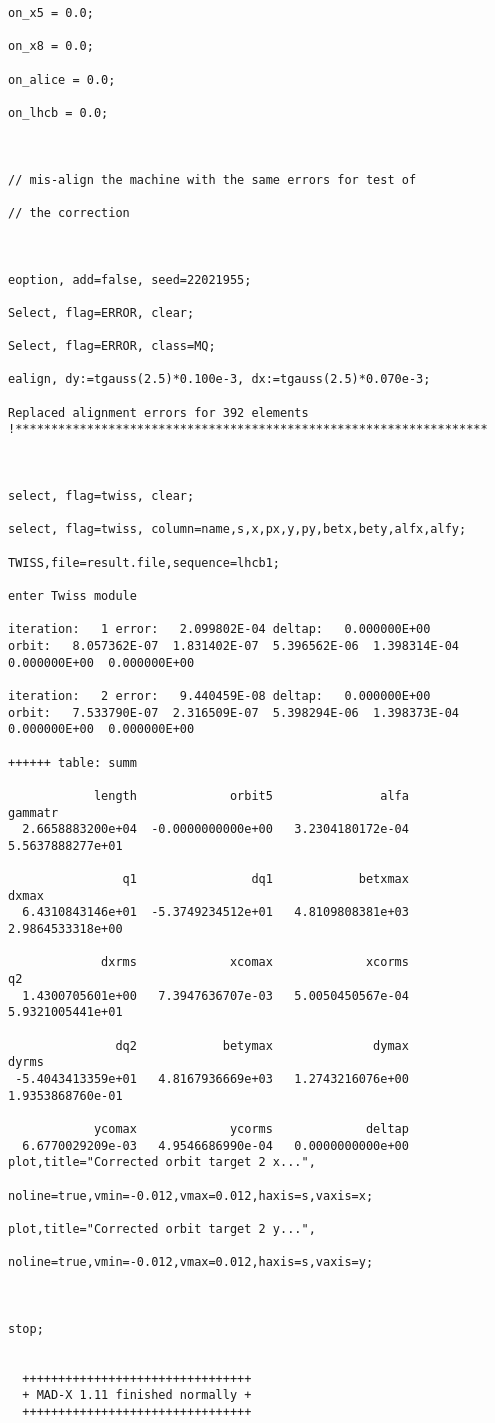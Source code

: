 \begin{verbatim}
on_x5 = 0.0;

on_x8 = 0.0;

on_alice = 0.0;

on_lhcb = 0.0;



// mis-align the machine with the same errors for test of 

// the correction



eoption, add=false, seed=22021955;

Select, flag=ERROR, clear;

Select, flag=ERROR, class=MQ;

ealign, dy:=tgauss(2.5)*0.100e-3, dx:=tgauss(2.5)*0.070e-3;

Replaced alignment errors for 392 elements
!******************************************************************



select, flag=twiss, clear;

select, flag=twiss, column=name,s,x,px,y,py,betx,bety,alfx,alfy;

TWISS,file=result.file,sequence=lhcb1; 

enter Twiss module
  
iteration:   1 error:   2.099802E-04 deltap:   0.000000E+00
orbit:   8.057362E-07  1.831402E-07  5.396562E-06  1.398314E-04  0.000000E+00  0.000000E+00
  
iteration:   2 error:   9.440459E-08 deltap:   0.000000E+00
orbit:   7.533790E-07  2.316509E-07  5.398294E-06  1.398373E-04  0.000000E+00  0.000000E+00

++++++ table: summ

            length             orbit5               alfa            gammatr 
  2.6658883200e+04  -0.0000000000e+00   3.2304180172e-04   5.5637888277e+01 

                q1                dq1            betxmax              dxmax 
  6.4310843146e+01  -5.3749234512e+01   4.8109808381e+03   2.9864533318e+00 

             dxrms             xcomax             xcorms                 q2 
  1.4300705601e+00   7.3947636707e-03   5.0050450567e-04   5.9321005441e+01 

               dq2            betymax              dymax              dyrms 
 -5.4043413359e+01   4.8167936669e+03   1.2743216076e+00   1.9353868760e-01 

            ycomax             ycorms             deltap 
  6.6770029209e-03   4.9546686990e-04   0.0000000000e+00 
plot,title="Corrected orbit target 2 x...",

noline=true,vmin=-0.012,vmax=0.012,haxis=s,vaxis=x;

plot,title="Corrected orbit target 2 y...",

noline=true,vmin=-0.012,vmax=0.012,haxis=s,vaxis=y;



stop;


  ++++++++++++++++++++++++++++++++
  + MAD-X 1.11 finished normally +
  ++++++++++++++++++++++++++++++++
\end{verbatim}
